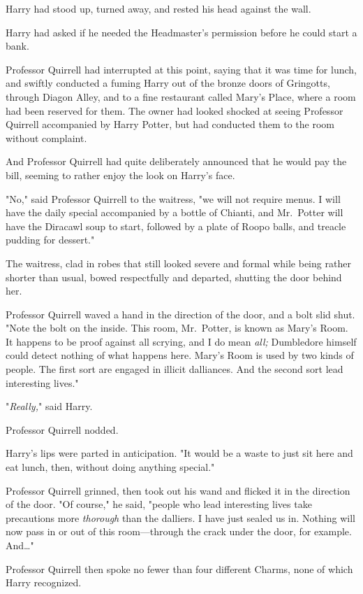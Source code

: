 Harry had stood up, turned away, and rested his head against the wall.

Harry had asked if he needed the Headmaster's permission before he could start 
a bank.

Professor Quirrell had interrupted at this point, saying that it was time for 
lunch, and swiftly conducted a fuming Harry out of the bronze doors of 
Gringotts, through Diagon Alley, and to a fine restaurant called Mary's Place, 
where a room had been reserved for them. The owner had looked shocked at seeing 
Professor Quirrell accompanied by Harry Potter, but had conducted them to the 
room without complaint.

And Professor Quirrell had quite deliberately announced that he would pay the 
bill, seeming to rather enjoy the look on Harry's face.

"No," said Professor Quirrell to the waitress, "we will not require menus. I 
will have the daily special accompanied by a bottle of Chianti, and Mr.~Potter 
will have the Diracawl soup to start, followed by a plate of Roopo balls, and 
treacle pudding for dessert."

The waitress, clad in robes that still looked severe and formal while being 
rather shorter than usual, bowed respectfully and departed, shutting the door 
behind her.

Professor Quirrell waved a hand in the direction of the door, and a bolt slid 
shut. "Note the bolt on the inside. This room, Mr.~Potter, is known as Mary's 
Room. It happens to be proof against all scrying, and I do mean \emph{all;} 
Dumbledore himself could detect nothing of what happens here. Mary's Room is 
used by two kinds of people. The first sort are engaged in illicit dalliances. 
And the second sort lead interesting lives."

"\emph{Really,}" said Harry.

Professor Quirrell nodded.

Harry's lips were parted in anticipation. "It would be a waste to just sit here 
and eat lunch, then, without doing anything special."

Professor Quirrell grinned, then took out his wand and flicked it in the 
direction of the door. "Of course," he said, "people who lead interesting lives 
take precautions more \emph{thorough} than the dalliers. I have just sealed us 
in. Nothing will now pass in or out of this room---through the crack under the 
door, for example. And{\ldots}"

Professor Quirrell then spoke no fewer than four different Charms, none of 
which Harry recognized.

